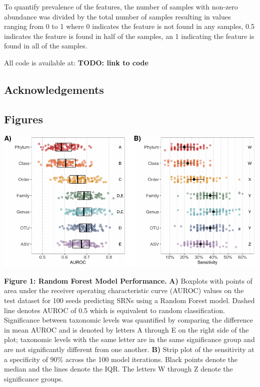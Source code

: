 \documentclass[
]{article}
\begin{document}
To quantify prevalence of the features, the number of samples with
non-zero abundance was divided by the total number of samples resulting
in values ranging from 0 to 1 where 0 indicates the feature is not found
in any samples, 0.5 indicates the feature is found in half of the
samples, an 1 indicating the feature is found in all of the samples.

All code is available at: \textbf{TODO: link to code}

\hypertarget{acknowledgements}{%
\subsection{Acknowledgements}\label{acknowledgements}}

\newpage

\hypertarget{figures}{%
\subsection{Figures}\label{figures}}

\includegraphics{manuscript_files/figure-latex/fig1-1.pdf}

\textbf{Figure 1: Random Forest Model Performance.} \textbf{A)} Boxplots
with points of area under the receiver operating characteristic curve
(AUROC) values on the test dataset for 100 seeds predicting SRNs using a
Random Forest model. Dashed line denotes AUROC of 0.5 which is
equivalent to random classification. Significance between taxonomic
levels was quantified by comparing the difference in mean AUROC and is
denoted by letters A through E on the right side of the plot; taxonomic
levels with the same letter are in the same significance group and are
not significantly different from one another. \textbf{B)} Strip plot of
the sensitivity at a specificity of 90\% across the 100 model
iterations. Black points denote the median and the lines denote the IQR.
The letters W through Z denote the significance groups.
\end{document}
